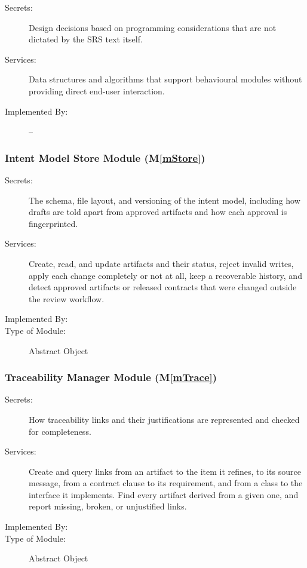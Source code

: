 \documentclass[12pt, titlepage]{article}
\newcommand{\mref}[1]{M\ref{#1}}
\begin{document}
\begin{description}
\item[Secrets:]Design decisions based on programming considerations that are not
  dictated by the SRS text itself.
\item[Services:]Data structures and algorithms that support behavioural modules
  without providing direct end-user interaction.
\item[Implemented By:] --
\end{description}

\subsubsection{Intent Model Store Module (\mref{mStore})}

\begin{description}
\item[Secrets:]The schema, file layout, and versioning of the intent model,
  including how drafts are told apart from approved artifacts and how each
  approval is fingerprinted.
\item[Services:]Create, read, and update artifacts and their status, reject
  invalid writes, apply each change completely or not at all, keep a
  recoverable history, and detect approved artifacts or released contracts that were
  changed outside the review workflow.
\item[Implemented By:] \progname{}
\item[Type of Module:] Abstract Object
\end{description}

\subsubsection{Traceability Manager Module (\mref{mTrace})}

\begin{description}
\item[Secrets:]How traceability links and their justifications are represented
  and checked for completeness.
\item[Services:]Create and query links from an artifact to the item it refines,
  to its source message, from a contract clause to its requirement, and from a
  class to the interface it implements. Find every artifact derived from a
  given one, and report missing, broken, or unjustified links.
\item[Implemented By:] \progname{}
\item[Type of Module:] Abstract Object
\end{description}
\end{document}
